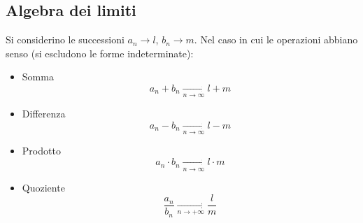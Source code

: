 \documentclass[10pt]{article}
\theoremstyle{plain}
\begin{document}
\subsection{Algebra dei limiti}
\begin{ther}
    Si considerino le successioni $a_n \rightarrow l$, $b_n \rightarrow m$. Nel caso in cui le operazioni abbiano senso (si escludono le forme indeterminate):
    \begin{itemize}
        \item Somma \[a_n + b_n \xrightarrow[n \rightarrow \infty]{} l + m\]
        \item Differenza \[a_n - b_n \xrightarrow[n \rightarrow \infty]{} l - m\]
        \item Prodotto \[a_n \cdot b_n \xrightarrow[n \rightarrow \infty]{} l \cdot m\]
        \item Quoziente \[\frac{a_n}{b_n} \xrightarrow[n \rightarrow +\infty]{} \frac{l}{m}\]
    \end{itemize}
\end{ther}
\end{document}
